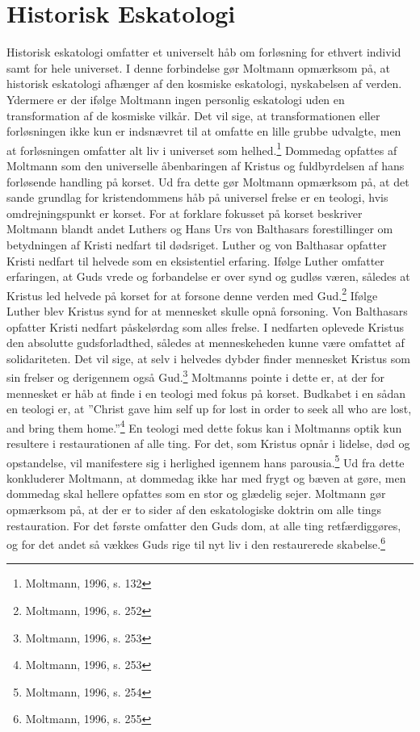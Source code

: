 \section{Historisk Eskatologi} 
Historisk eskatologi omfatter et universelt håb om forløsning for ethvert individ samt for hele universet. I denne forbindelse gør Moltmann opmærksom på, at historisk eskatologi afhænger af den kosmiske eskatologi, nyskabelsen af verden. Ydermere er der ifølge Moltmann ingen personlig eskatologi uden en transformation af de kosmiske vilkår. Det vil sige, at transformationen eller forløsningen ikke kun er indsnævret til at omfatte en lille grubbe udvalgte, men at forløsningen omfatter alt liv i universet som helhed.\footnote{Moltmann, 1996, s. 132} Dommedag opfattes af Moltmann som den universelle åbenbaringen af Kristus og fuldbyrdelsen af hans forløsende handling på korset. Ud fra dette gør Moltmann opmærksom på, at det sande grundlag for kristendommens håb på universel frelse er en teologi, hvis omdrejningspunkt er korset. For at forklare fokusset på korset beskriver Moltmann blandt andet Luthers og Hans Urs von Balthasars forestillinger om betydningen af Kristi nedfart til dødsriget. Luther og von Balthasar opfatter Kristi nedfart til helvede som en eksistentiel erfaring. Ifølge Luther omfatter erfaringen, at Guds vrede og forbandelse er over synd og gudløs væren, således at Kristus led helvede på korset for at forsone denne verden med Gud.\footnote{Moltmann, 1996, s. 252} Ifølge Luther blev Kristus synd for at mennesket skulle opnå forsoning. Von Balthasars opfatter Kristi nedfart påskelørdag som alles frelse. I nedfarten oplevede Kristus den absolutte gudsforladthed, således at menneskeheden kunne være omfattet af solidariteten. Det vil sige, at selv i helvedes dybder finder mennesket Kristus som sin frelser og derigennem også Gud.\footnote{Moltmann, 1996, s. 253} Moltmanns pointe i dette er, at der for mennesket er håb at finde i en teologi med fokus på korset. Budkabet i en sådan en teologi er, at ”Christ gave him self up for lost in order to seek all who are lost, and bring them home.”\footnote{Moltmann, 1996, s. 253} En teologi med dette fokus kan i Moltmanns optik kun resultere i restaurationen af alle ting. For det, som Kristus opnår i lidelse, død og opstandelse, vil manifestere sig i herlighed igennem hans parousia.\footnote{Moltmann, 1996, s. 254} Ud fra dette konkluderer Moltmann, at dommedag ikke har med frygt og bæven at gøre, men dommedag skal hellere opfattes som en stor og glædelig sejer. Moltmann gør opmærksom på, at der er to sider af den eskatologiske doktrin om alle tings restauration. For det første omfatter den Guds dom, at alle ting retfærdiggøres, og for det andet så vækkes Guds rige til nyt liv i den restaurerede skabelse.\footnote{Moltmann, 1996, s. 255}